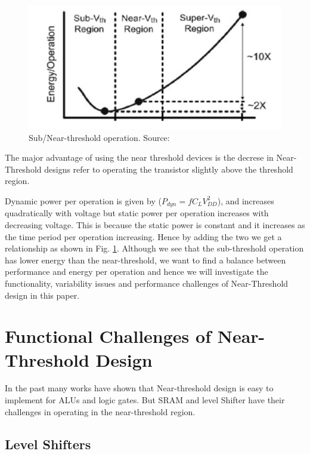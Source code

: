 \documentclass[conference]{IEEEtran}
\begin{document}
\begin{figure}[htbp]
	\includegraphics[width=\linewidth]{img/Pictures/Energy_comparison.png}
	\centering
	\caption{Sub/Near-threshold operation. Source: \cite{b1}}
	\label{fig:Energy_comparison}
\end{figure}

The major advantage of using the near threshold devices is the decrese in
Near-Threshold designs refer to operating the transistor slightly above the
threshold region.

Dynamic power per operation is given by ($P_{dyn}=fC_LV_{DD}^2$), and increases
quadratically with voltage but static power per operation increases with
decreasing voltage. This is because the static power
is constant and it increases as the time period per operation increasing.
Hence by adding the two we get a relationship as shown in Fig. \ref{fig:Energy_comparison}. Although we see that the sub-threshold operation
has lower energy than the near-threshold, we want to find a balance between
performance and energy per operation and hence we will investigate the
functionality, variability issues and performance challenges of Near-Threshold
design in this paper.

\section{Functional Challenges of Near-Threshold Design}
\label{sec:Func_challenges}

In the past many works have shown that Near-threshold design is easy to implement for ALUs and logic gates. But SRAM and level Shifter have their challenges in operating in the near-threshold region.

\subsection{Level Shifters}
\end{document}
